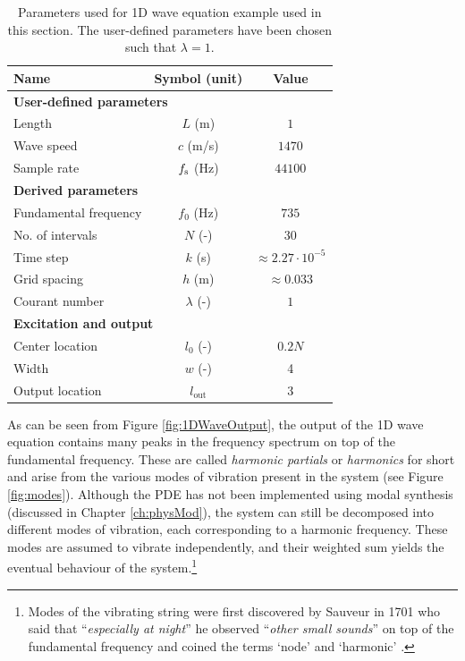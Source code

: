 \begin{table}[h]
    \begin{center}
    \begin{tabular}{|l|c|c|}
        \hline
        Name & Symbol (unit) & Value\\ \hline
        \multicolumn{3}{|l|}{\bf User-defined parameters}\\ \hline
        Length & $L$ (m) & $1$\\
        Wave speed & $c$ (m/s) & $1470$\\
        Sample rate & $f_\text{s}$ (Hz) & $44100$ \\\hline
        \multicolumn{3}{|l|}{\bf Derived parameters}\\ \hline
        Fundamental frequency & $f_0$ (Hz) & $735$\\
        No. of intervals & $N$ (-) & $30$ \\
        Time step & $k$ (s)& $\approx 2.27\cdot 10^{-5}$ \\
        Grid spacing & $h$ (m)& $\approx 0.033$ \\
        Courant number & $\lambda$ (-)& $1$ \\\hline
        \multicolumn{3}{|l|}{\bf Excitation and output}\\ \hline
        Center location& $l_0$ (-)& $0.2N$\\
        Width& $w$ (-)& 4\\
        Output location & $l_\text{out}$ & 3 \\\hline
    \end{tabular}
    \caption{Parameters used for 1D wave equation example used in this section. The user-defined parameters have been chosen such that $\lambda = 1$. \label{tab:1DWaveParams}}
    \end{center}
\end{table}

As can be seen from Figure \ref{fig:1DWaveOutput}, the output of the 1D wave equation contains many peaks in the frequency spectrum on top of the fundamental frequency. These are called \textit{harmonic partials} or \textit{harmonics} for short and arise from the various modes of vibration present in the system (see Figure \ref{fig:modes}). Although the PDE has not been implemented using modal synthesis (discussed in Chapter \ref{ch:physMod}), the system can still be decomposed into different modes of vibration, each corresponding to a harmonic frequency. These modes are assumed to vibrate independently, and their weighted sum yields the eventual behaviour of the system.\footnote{Modes of the vibrating string were first discovered by Sauveur in 1701 who said that  ``\textit{especially at night}'' he observed ``\textit{other small sounds}'' on top of the fundamental frequency and coined the terms `node' and `harmonic' \cite{Sauveur1701}.}

